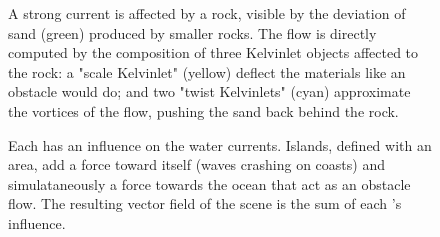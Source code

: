 \begin{figure}
    \caption{A strong current is affected by a rock, visible by the deviation of sand (green) produced by smaller rocks. The flow is directly computed by the composition of three Kelvinlet objects affected to the rock: a "scale Kelvinlet" (yellow) deflect the materials like an obstacle would do; and two "twist Kelvinlets" (cyan) approximate the vortices of the flow, pushing the sand back behind the rock. }
    \label{fig:env-obj-rock-with-kelvinlets}
\end{figure}
\begin{figure}
    \caption{Each  has an influence on the water currents. Islands, defined with an area, add a force toward itself (waves crashing on coasts) and simulataneously a force towards the ocean that act as an obstacle flow. The resulting vector field of the scene is the sum of each 's influence. }
    \label{fig:env-obj-island-flowfield}
\end{figure}


